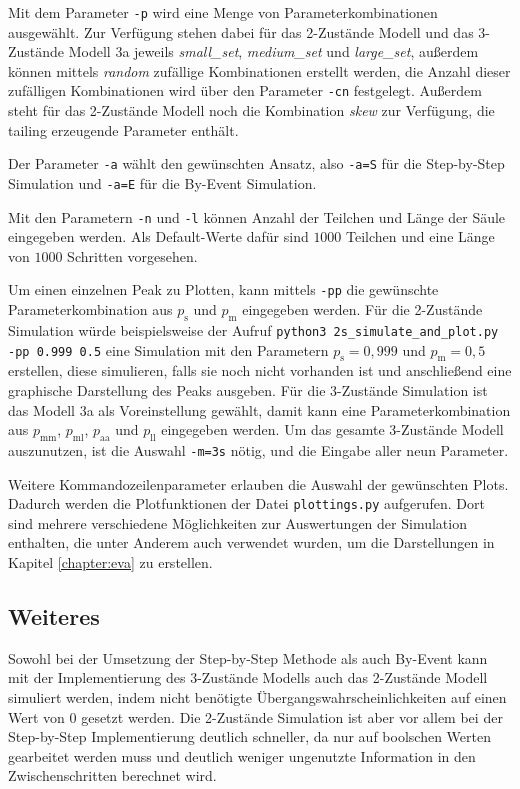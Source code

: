 Mit dem Parameter \texttt{-p} wird eine Menge von Parameterkombinationen ausgewählt. Zur Verfügung stehen dabei für das 2-Zustände Modell und das 3-Zustände Modell 3a jeweils \textit{small\_set}, \textit{medium\_set} und \textit{large\_set}, außerdem können mittels \textit{random} zufällige Kombinationen erstellt werden, die Anzahl dieser zufälligen Kombinationen wird über den Parameter \texttt{-cn} festgelegt. Außerdem steht für das 2-Zustände Modell noch die Kombination \textit{skew} zur Verfügung, die tailing erzeugende Parameter enthält.

Der Parameter \texttt{-a} wählt den gewünschten Ansatz, also \texttt{-a=S} für die Step-by-Step Simulation und \texttt{-a=E} für die By-Event Simulation.

Mit den Parametern \texttt{-n} und \texttt{-l} können Anzahl der Teilchen und Länge der Säule eingegeben werden. Als Default-Werte dafür sind $1000$ Teilchen und eine Länge von $1000$ Schritten vorgesehen.

Um einen einzelnen Peak zu Plotten, kann mittels \texttt{-pp} die gewünschte Parameterkombination aus $p_\text{s}$ und $p_\text{m}$ eingegeben werden. Für die 2-Zustände Simulation würde beispielsweise der Aufruf \verb!python3 2s_simulate_and_plot.py -pp 0.999 0.5! eine Simulation mit den Parametern $p_\text{s} = 0,999$ und $p_\text{m} = 0,5$ erstellen, diese simulieren, falls sie noch nicht vorhanden ist und anschließend eine graphische Darstellung des Peaks ausgeben. 
Für die 3-Zustände Simulation ist das Modell 3a als Voreinstellung gewählt, damit kann eine Parameterkombination aus $p_\text{mm}$, $p_\text{ml}$, $p_\text{aa}$ und $p_\text{ll}$ eingegeben werden. Um das gesamte 3-Zustände Modell auszunutzen, ist die Auswahl \texttt{-m=3s} nötig, und die Eingabe aller neun Parameter. 

Weitere Kommandozeilenparameter erlauben die Auswahl der gewünschten Plots. Dadurch werden die Plotfunktionen der Datei \texttt{plottings.py} aufgerufen. Dort sind mehrere verschiedene Möglichkeiten zur Auswertungen der Simulation enthalten, die unter Anderem auch verwendet wurden, um die Darstellungen in Kapitel \ref{chapter:eva} zu erstellen.  


\subsection{Weiteres} 
Sowohl bei der Umsetzung der Step-by-Step Methode als auch By-Event kann mit der Implementierung des 3-Zustände Modells auch das 2-Zustände Modell simuliert werden, indem nicht benötigte Übergangswahrscheinlichkeiten auf einen Wert von $0$ gesetzt werden. Die 2-Zustände Simulation ist aber vor allem bei der Step-by-Step Implementierung deutlich schneller, da nur auf boolschen Werten gearbeitet werden muss und deutlich weniger ungenutzte Information in den Zwischenschritten berechnet wird.


